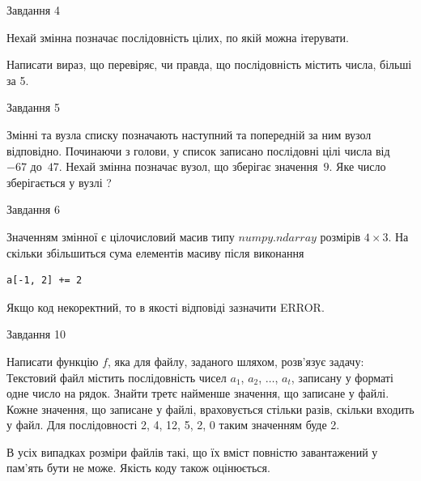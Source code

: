\documentclass[12pt, ukrainian]{article}
\begin{document}
{               
{\begin{center}Завдання {4}\end{center}}
\vspace{-6mm}
Нехай змінна  позначає послідовність цілих, по якій можна ітерувати.

Написати вираз, що перевіряє, чи правда, що послідовність  містить числа, більші за 5.\par

\vspace{10mm}
               
{\begin{center}Завдання {5}\end{center}}
\vspace{-6mm}
Змінні  та  вузла списку позначають наступний та попередній за ним вузол відповідно. Починаючи з голови, у список записано послідовні цілі числа від~$-67$ до~$47$. Нехай змінна  позначає вузол, що зберігає значення~$9$.
Яке число зберігається у вузлі  ?\par

               
{\begin{center}Завдання {6}\end{center}}
\vspace{-6mm}
Значенням змінної  є цілочисловий масив типу $numpy.ndarray$ розмірів $4{\times}3$. На скільки збільшиться сума елементів масиву  після виконання
\begin{verbatim}
a[-1, 2] += 2
\end{verbatim}


Якщо код некоректний, то в якості відповіді зазначити ERROR.\par

               
{\begin{center}Завдання {10}\end{center}}
\vspace{-6mm}

Написати функцію $f$, яка для файлу, заданого шляхом, розв’язує задачу:\\ Текстовий файл містить послідовність чисел $a_1$, $a_2$, $\ldots$, $a_t$, записану у форматі одне число на рядок. Знайти третє найменше значення, що записане у файлі. Кожне значення, що записане у файлі, враховується стільки разів, скільки входить у файл. Для послідовності 2, 4, 12, 5, 2, 0 таким значенням буде 2.

В усіх випадках розміри файлів такі, що їх вміст повністю завантажений у пам'ять бути не може. Якість коду також оцінюється.



}
\end{document}
